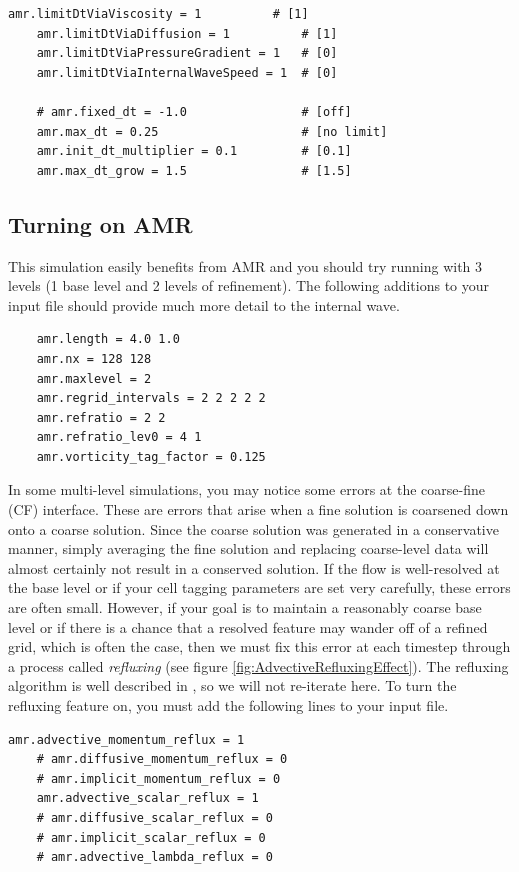 \documentclass[12pt]{article}
\begin{document}
\begin{lstlisting}[caption={Timestep-limiting input parameters.},label=lstTimestepLimiting]
	amr.limitDtViaViscosity = 1          # [1]
	amr.limitDtViaDiffusion = 1          # [1]
	amr.limitDtViaPressureGradient = 1   # [0]
	amr.limitDtViaInternalWaveSpeed = 1  # [0]

	# amr.fixed_dt = -1.0                # [off]
	amr.max_dt = 0.25                    # [no limit]
	amr.init_dt_multiplier = 0.1         # [0.1]
	amr.max_dt_grow = 1.5                # [1.5]
\end{lstlisting}


\subsection{Turning on AMR}
This simulation easily benefits from AMR and you should try running with 3 levels (1 base level and 2 levels of refinement). The following additions to your input file should provide much more detail to the internal wave.
\begin{lstlisting}
	amr.length = 4.0 1.0
	amr.nx = 128 128
	amr.maxlevel = 2
	amr.regrid_intervals = 2 2 2 2 2
	amr.refratio = 2 2
	amr.refratio_lev0 = 4 1
	amr.vorticity_tag_factor = 0.125
\end{lstlisting}

In some multi-level simulations, you may notice some errors at the coarse-fine (CF) interface. These are errors that arise when a fine solution is coarsened down onto a coarse solution. Since the coarse solution was generated in a conservative manner, simply averaging the fine solution and replacing coarse-level data will almost certainly not result in a conserved solution. If the flow is well-resolved at the base level or if your cell tagging parameters are set very carefully, these errors are often small. However, if your goal is to maintain a reasonably coarse base level or if there is a chance that a resolved feature may wander off of a refined grid, which is often the case, then we must fix this error at each timestep through a process called \textit{refluxing} (see figure \ref{fig:AdvectiveRefluxingEffect}). The refluxing algorithm is well described in \cite{MartinThesis, Bell1989}, so we will not re-iterate here. To turn the refluxing feature on, you must add the following lines to your input file.
\begin{lstlisting}[caption={The advective refluxing parameters.}]
	amr.advective_momentum_reflux = 1
	# amr.diffusive_momentum_reflux = 0
	# amr.implicit_momentum_reflux = 0
	amr.advective_scalar_reflux = 1
	# amr.diffusive_scalar_reflux = 0
	# amr.implicit_scalar_reflux = 0
	# amr.advective_lambda_reflux = 0
\end{lstlisting}
\end{document}
